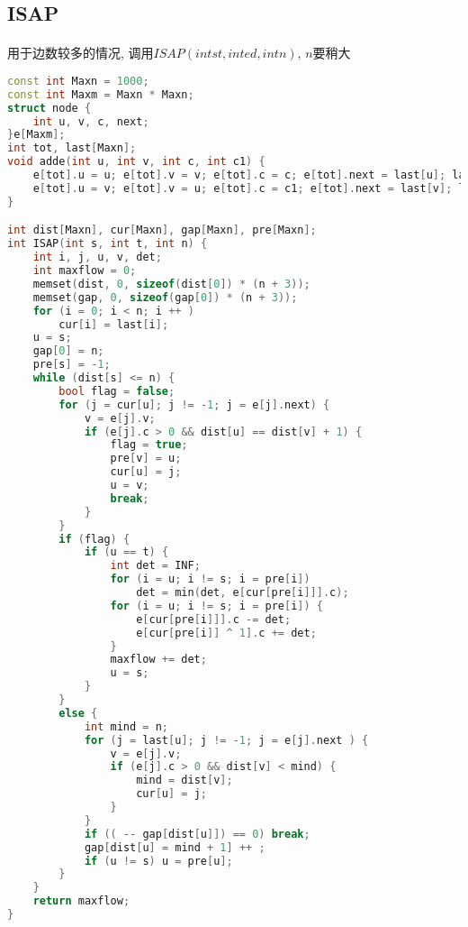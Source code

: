 ﻿\subsection{ISAP}
	\paragraph{}
	用于边数较多的情况, 调用$ ISAP(int st, int ed, int n) $, $ n $要稍大
    \begin{lstlisting}[language=C++]
const int Maxn = 1000;
const int Maxm = Maxn * Maxn;
struct node {
    int u, v, c, next;
}e[Maxm];
int tot, last[Maxn];
void adde(int u, int v, int c, int c1) {
    e[tot].u = u; e[tot].v = v; e[tot].c = c; e[tot].next = last[u]; last[u] = tot++;
    e[tot].u = v; e[tot].v = u; e[tot].c = c1; e[tot].next = last[v]; last[v] = tot++;
}

int dist[Maxn], cur[Maxn], gap[Maxn], pre[Maxn];
int ISAP(int s, int t, int n) {
    int i, j, u, v, det;
    int maxflow = 0;
    memset(dist, 0, sizeof(dist[0]) * (n + 3));
    memset(gap, 0, sizeof(gap[0]) * (n + 3));
    for (i = 0; i < n; i ++ )
        cur[i] = last[i];
    u = s;
    gap[0] = n;
    pre[s] = -1;
    while (dist[s] <= n) {
        bool flag = false;
        for (j = cur[u]; j != -1; j = e[j].next) {
            v = e[j].v;
            if (e[j].c > 0 && dist[u] == dist[v] + 1) {
                flag = true;
                pre[v] = u;
                cur[u] = j;
                u = v;
                break;
            }
        }
        if (flag) {
            if (u == t) {
                int det = INF;
                for (i = u; i != s; i = pre[i])
                    det = min(det, e[cur[pre[i]]].c);
                for (i = u; i != s; i = pre[i]) {
                    e[cur[pre[i]]].c -= det;
                    e[cur[pre[i]] ^ 1].c += det;
                }
                maxflow += det;
                u = s;
            }
        }
        else {
            int mind = n;
            for (j = last[u]; j != -1; j = e[j].next ) {
                v = e[j].v;
                if (e[j].c > 0 && dist[v] < mind) {
                    mind = dist[v];
                    cur[u] = j;
                }
            }
            if (( -- gap[dist[u]]) == 0) break;
            gap[dist[u] = mind + 1] ++ ;
            if (u != s) u = pre[u];
        }
    }
    return maxflow;
}
\end{lstlisting}
